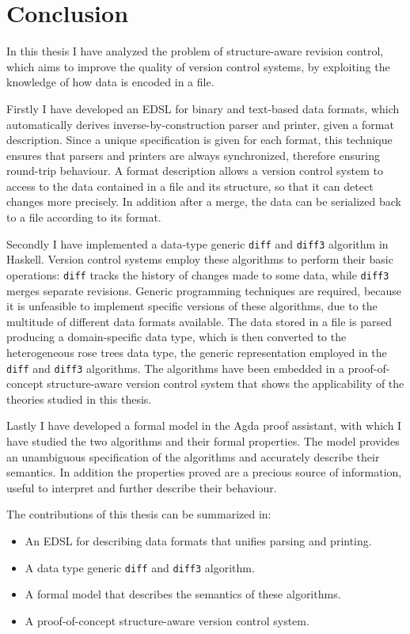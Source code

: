 \documentclass[../Thesis.tex]{subfiles}
\begin{document}
\chapter{Conclusion}
\label{chp:Conclusion}
In this thesis I have analyzed the problem of structure-aware revision control,
which aims to improve the quality of version control systems, by
exploiting the knowledge of how data is encoded in a file.

Firstly I have developed an EDSL for binary and text-based data formats, which
automatically derives inverse-by-construction 
parser and printer, given a format description.
Since a unique specification is given for each
format, this technique ensures that parsers and printers are 
always synchronized, therefore ensuring round-trip behaviour.
A format description allows a version control system 
to access to the data contained in a file and its structure, so that 
it can detect changes more precisely. In addition
after a merge, the data can be serialized back to a file according to its format.

Secondly I have implemented a data-type generic \texttt{diff} and \texttt{diff3}
algorithm in Haskell. 
Version control systems employ these algorithms to perform their basic operations: \texttt{diff} tracks the history of changes made to
some data, while \texttt{diff3} merges separate revisions.
Generic programming techniques are required, because  it is unfeasible to implement specific versions of these algorithms, due to the multitude of different data formats available.	
The data stored in a file is parsed producing a domain-specific data type, which is then converted to the heterogeneous rose trees
data type, the generic representation employed in the \texttt{diff} and 
\texttt{diff3} algorithms.
The algorithms have been embedded in a proof-of-concept structure-aware version
control system that shows the applicability of the theories studied in this 
thesis.

Lastly I have developed a formal model in the Agda proof assistant, 
with which I have studied the two algorithms and their formal properties.
The model provides an unambiguous specification of the algorithms
and accurately describe their semantics.
In addition the properties proved are a precious 
source of information, useful to interpret and further 
describe their behaviour. 

The contributions of this thesis can be summarized in:
\begin{itemize}
	\item An EDSL for describing data formats that unifies parsing and printing.
	\item A data type generic \texttt{diff} and \texttt{diff3} algorithm.
	\item A formal model that describes the semantics of these algorithms.
	\item A proof-of-concept structure-aware version control system.
\end{itemize}
\end{document}

